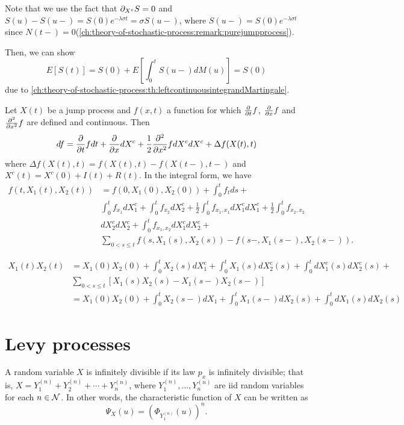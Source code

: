\begin{refsection}
\begin{example}
	
	
	Note that we use the fact that $\partial_{X^c} S = 0$ and $S(u) - S(u-) = S(0)e^{-\lambda \sigma t} = \sigma S(u-)$, where $S(u-) = S(0)e^{-\lambda \sigma t}$ since $N(t-) = 0$(\autoref{ch:theory-of-stochastic-process:remark:purejumpprocess}).
	
	Then, we can show
	$$E[S(t)] = S(0) + E[\int_0^t S(u-)dM(u)] = S(0)$$
	due to \autoref{ch:theory-of-stochastic-process:th:leftcontinuousintegrandMartingale}.
\end{example}

\begin{lemma}\cite[489]{shreve2004stochastic2}
	Let $X(t)$ be a jump process and $f(x,t)$ a function for which $\frac{\partial}{\partial t}f$, $\frac{\partial}{\partial x}f$ and $\frac{\partial^2}{\partial x^2}f$ are defined and continuous. Then
	$$df = \frac{\partial}{\partial t}f dt + \frac{\partial}{\partial x}dX^c + \frac{1}{2}\frac{\partial^2}{\partial x^2}f dX^cdX^c + \Delta f(X(t),t)$$
	where $\Delta f(X(t),t) = f(X(t),t) - f(X(t-),t-)$ and $X^c(t) = X^c(0) + I(t) + R(t)$.
	In the integral form, we have
	\begin{align*}
	f(t,X_1(t),X_2(t))& = f(0,X_1(0),X_2(0)) + \int_0^t f_t ds + \\ &\int_0^tf_{x_1}dX^c_1 +\int_0^tf_{x_2}dX^c_2 + \frac{1}{2}\int_0^t f_{x_1,x_1} dX^c_1dX^c_1 + \frac{1}{2}\int_0^t f_{x_2,x_2}\\ &dX^c_2dX^c_2+\int_0^t f_{x_1,x_2} dX^c_1dX^c_2 + \\
	&\sum_{0<s\leq t} f(s,X_1(s),X_2(s)) - f(s-,X_1(s-),X_2(s-)).
	\end{align*}
\end{lemma}


\begin{lemma}
	\begin{align*}
	X_1(t)X_2(t) &= X_1(0)X_2(0) + \int_0^t X_2(s)dX_1^c + \int_0^t X_1(s)dX_2^c(s) + \int_0^t dX_1^c(s)dX_2^c(s) +\\ 
	&\sum_{0<s\leq t}[X_1(s)X_2(s) - X_1(s-)X_2(s-)]\\
	&=X_1(0)X_2(0) + \int_0^t X_2(s-)dX_1 + \int_0^t X_1(s-)dX_2(s) + \int_0^t dX_1(s)dX_2(s)
	\end{align*}
\end{lemma}





\section{Levy processes}
\begin{definition}
	A random variable $X$ is infinitely divisible if its law $p_x$ is infinitely divisible; that is, $X = Y_1^{(n)}+Y_2^{(n)}+\cdots+Y_n^{(n)}$, where $Y_1^{(n)},...,Y_n^{(n)}$ are iid random variables for each $n\in \mathcal{N}$. In other words, the characteristic function of $X$ can be written as
	$$\Psi_X(u) = (\Phi_{Y_1^{(n)}}(u))^n.$$
\end{definition}


\end{refsection}
